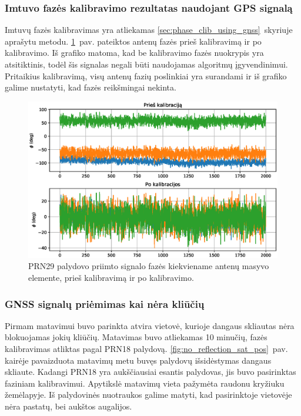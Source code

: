 \documentclass[main.tex]{subfiles}
\begin{document}
\subsubsection{Imtuvo fazės kalibravimo rezultatas naudojant GPS signalą}

Imtuvų fazės kalibravimas yra atliekamas \ref{sec:phase_clib_using_gnss}~skyriuje
aprašytu metodu. \ref{fig:gnss_phase_calibration}~pav. pateiktos
antenų fazės prieš kalibravimą ir po kalibravimo. Iš grafiko matoma,
kad be kalibravimo fazės nuokrypis yra atsitiktinis, todėl šis signalas
negali būti naudojamas algoritmų įgyvendinimui. Pritaikius kalibravimą,
visų antenų fazių poslinkiai yra surandami ir iš grafiko galime nustatyti,
kad fazės reikšmingai nekinta.

\begin{figure}[ht]
    \begin{centering}
    \includegraphics[scale=0.65]{drawings/phase_calibration}
    \par\end{centering}
    \protect\caption{\label{fig:gnss_phase_calibration}PRN29 palydovo priimto signalo fazės kiekviename antenų masyvo elemente, prieš kalibravimą ir po kalibravimo.}
\end{figure}

\subsubsection{GNSS signalų priėmimas kai nėra kliūčių}\label{sec:gnss_meas_no_reflection}

Pirmam matavimui buvo parinkta atvira vietovė, kurioje dangaus skliautas nėra blokuojamas
jokių kliūčių. Matavimas buvo atliekamas 10 minučių, fazės kalibravimas atliktas pagal PRN18 palydovą.
\ref{fig:no_reflection_sat_pos}~pav. kairėje pavaizduota matavimų metu buvęs palydovų išsidėstymas
dangaus skliaute. Kadangi PRN18 yra aukščiausiai esantis palydovas, jis buvo pasirinktas
faziniam kalibravimui. Apytikslė matavimų vieta pažymėta raudonu kryžiuku žemėlapyje.
Iš palydovinės nuotraukos galime matyti, kad pasirinktoje vietovėje nėra pastatų,
bei aukštos augalijos.
\end{document}

